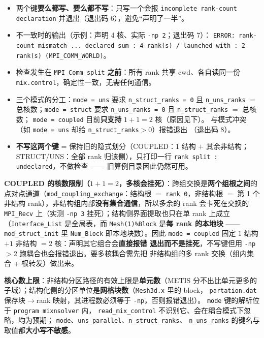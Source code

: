 \documentclass[11pt,a4paper]{ctexart}
\begin{document}
\begin{itemize}\itemsep2pt
  \item 两个键\textbf{要么都写、要么都不写}：只写一个会报
        \texttt{incomplete rank-count declaration} 并退出（退出码 6），避免“声明了一半”。
  \item 不一致时的输出（示例：声明 4 核、实际 \texttt{-np 2}；退出码 7）：
        \texttt{ERROR: rank-count mismatch ... declared sum : 4 rank(s) / launched
        with : 2 rank(s) (MPI\_COMM\_WORLD)}。
  \item 检查发生在 \texttt{MPI\_Comm\_split} \textbf{之前}：所有 rank 共享 cwd、各自读同一份
        \texttt{mix.control}，确定性一致，无需任何通信。
  \item 三个模式的分工：\texttt{mode = uns} 要求 \texttt{n\_struct\_ranks = 0} 且
        \texttt{n\_uns\_ranks} $=$ 总核数；\texttt{mode = struct} 要求
        \texttt{n\_uns\_ranks = 0} 且 \texttt{n\_struct\_ranks} $=$ 总核数；
        \texttt{mode = coupled} 目前\textbf{只支持} $1+1=2$ 核（原因见下）。
        与模式冲突（如 \texttt{mode = uns} 却给 \texttt{n\_struct\_ranks}$>$0）报错退出
        （退出码 8）。
  \item \textbf{不写这两个键} = 保持旧的隐式划分（COUPLED：1 结构 $+$ 其余非结构；
        STRUCT/UNS：全部 rank 归该侧），只打印一行
        \texttt{rank split : undeclared}，不做检查 —— 旧算例目录因此仍然可用。
\end{itemize}

\textbf{COUPLED 的核数限制（$1+1=2$，多核会挂死）}：跨组交换是\textbf{两个组根之间}的
点对点通道（\texttt{mod\_coupling\_exchange}：结构根 $=$ \texttt{rank 0}，非结构根 $=$
第 1 个非结构 rank），非结构组内部\textbf{没有集合通信}，所以多余的 rank 会卡死在交换的
\texttt{MPI\_Recv} 上（实测 \texttt{-np 3} 挂死）；结构侧界面提取也只在单 rank 上成立
（\texttt{Interface\_List} 是全局表，而 \texttt{Mesh(1)\%Block} 是\textbf{每 rank 的本地块}
—— \texttt{mod\_struct\_init} 里 \texttt{Num\_Block} 即本地块数）。因此
\texttt{mode = coupled} 固定 $1$ 结构 $+1$ 非结构 $=2$ 核：声明其它组合会\textbf{直接报错
退出而不是挂死}，不写键但用 \texttt{-np}$>$2 跑耦合也会报错退出。要多核耦合需先把
非结构组的多 rank 交换（组内集合 + 根转发）做出来。

\textbf{核心数上限}：非结构分区路径的有效上限是\textbf{单元数}（METIS 分不出比单元更多的
子域）；结构化侧的分区单位是\textbf{网格块数}（\texttt{Mesh3d.x} 里的 block，
\texttt{partation.dat} 保存块$\to$rank 映射，其进程数必须等于 \texttt{-np}，否则报错退出）。
\texttt{mode} 键的解析位于 \texttt{program mixnsolver} 内，
\texttt{read\_mix\_control} 不识别它、会在耦合模式下忽略，均为预期；
\texttt{mode}、\texttt{uns\_parallel}、\texttt{n\_struct\_ranks}、
\texttt{n\_uns\_ranks} 的键名与取值都\textbf{大小写不敏感}。
\end{document}
